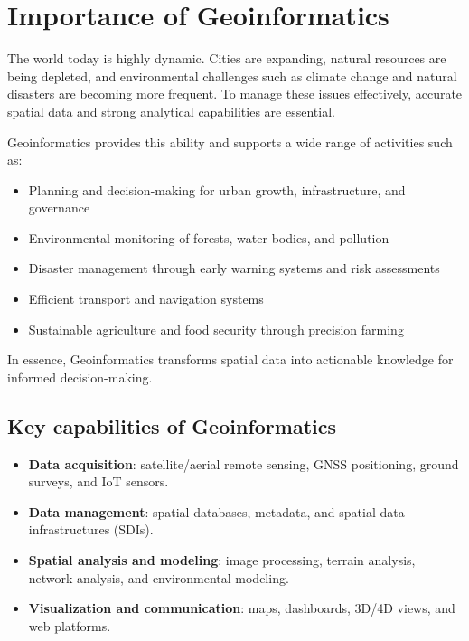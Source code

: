 \documentclass[
  11pt,
  letterpaper,
]{book}
\providecommand{\tightlist}{%
  \setlength{\itemsep}{0pt}\setlength{\parskip}{0pt}}
\begin{document}
\section{Importance of
Geoinformatics}\label{importance-of-geoinformatics}

The world today is highly dynamic. Cities are expanding, natural
resources are being depleted, and environmental challenges such as
climate change and natural disasters are becoming more frequent. To
manage these issues effectively, accurate spatial data and strong
analytical capabilities are essential.

Geoinformatics provides this ability and supports a wide range of
activities such as:

\begin{itemize}
\tightlist
\item
  Planning and decision-making for urban growth, infrastructure, and
  governance\\
\item
  Environmental monitoring of forests, water bodies, and pollution\\
\item
  Disaster management through early warning systems and risk
  assessments\\
\item
  Efficient transport and navigation systems\\
\item
  Sustainable agriculture and food security through precision farming
\end{itemize}

In essence, Geoinformatics transforms spatial data into actionable
knowledge for informed decision-making.

\subsection{Key capabilities of
Geoinformatics}\label{key-capabilities-of-geoinformatics}

\begin{itemize}
\tightlist
\item
  \textbf{Data acquisition}: satellite/aerial remote sensing, GNSS
  positioning, ground surveys, and IoT sensors.\\
\item
  \textbf{Data management}: spatial databases, metadata, and spatial
  data infrastructures (SDIs).\\
\item
  \textbf{Spatial analysis and modeling}: image processing, terrain
  analysis, network analysis, and environmental modeling.\\
\item
  \textbf{Visualization and communication}: maps, dashboards, 3D/4D
  views, and web platforms.
\end{itemize}
\end{document}

